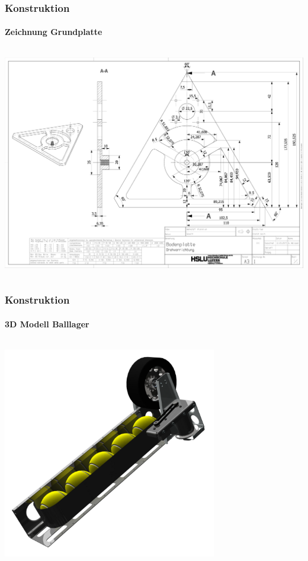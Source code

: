 \begin{frame}
    \frametitle{Konstruktion}
    \framesubtitle{Zeichnung Grundplatte}
    \begin{columns}
        \begin{column}{1\textwidth}
            \centering
            \includegraphics[width=1.0\textwidth]{FotosM/Bild1.pdf}
        \end{column}
    \end{columns}
\end{frame}
\begin{frame}
    \frametitle{Konstruktion}
    \framesubtitle{3D Modell Balllager}
    \begin{columns}
        \begin{column}{0.9\textwidth}
            \centering
            \includegraphics[width=0.7\textwidth]{FotosM/Bild7.png}
        \end{column}
    \end{columns}
\end{frame}
